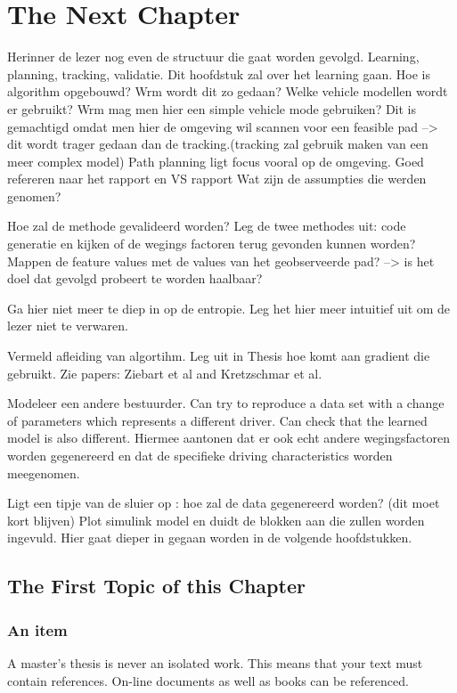 \chapter{The Next Chapter}
\label{cha:2}
Herinner de lezer nog even de structuur die gaat worden gevolgd. 
Learning, planning, tracking, validatie.
Dit hoofdstuk zal over het learning gaan.
Hoe is algorithm opgebouwd? Wrm wordt dit zo gedaan?
Welke vehicle modellen wordt er gebruikt? Wrm mag men hier een simple vehicle mode gebruiken?
Dit is gemachtigd omdat men hier de omgeving wil scannen voor een feasible pad --> dit wordt trager gedaan dan de tracking.(tracking zal gebruik maken van een meer complex model) Path planning ligt focus vooral op de omgeving.
Goed refereren naar het rapport en VS rapport
Wat zijn de assumpties die werden genomen?

Hoe zal de methode gevalideerd worden? Leg de twee methodes uit: code generatie en kijken of de wegings factoren terug gevonden kunnen worden? Mappen de feature values met de values van het geobserveerde pad? --> is het doel dat gevolgd probeert te worden haalbaar? 

Ga hier niet meer te diep in op de entropie. Leg het hier meer intuitief uit om de lezer niet te verwaren. 

Vermeld afleiding van algortihm. Leg uit in Thesis hoe komt aan gradient die gebruikt. Zie papers: Ziebart et al and Kretzschmar et al.

Modeleer een andere bestuurder. Can try to reproduce a data set with a change of parameters which represents a different driver. Can check that the learned model is also different. Hiermee aantonen dat er ook echt andere wegingsfactoren worden gegenereerd en dat de specifieke driving characteristics worden meegenomen.

Ligt een tipje van de sluier op : hoe zal de data gegenereerd worden? (dit moet kort blijven)
Plot simulink model en duidt de blokken aan die zullen worden ingevuld. Hier gaat dieper in gegaan worden in de volgende hoofdstukken. 

\section{The First Topic of this Chapter}


\subsection{An item}
A master's thesis is never an isolated work. This means that your text must
contain references. On-line documents\cite{wiki} as well as
books\cite{pratchett06:_good_omens} can be referenced.

